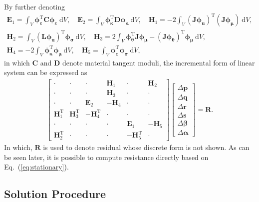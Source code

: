 \documentclass[3p,sort&compress,11pt,fleqn,review]{elsarticle}
\newcommand*{\eqsref}[1]{Eq.~(\ref{#1})}
\newcommand*{\mb}[1]{\boldsymbol{#1}}
\newcommand*{\mT}{\mathrm{T}}
\newcommand*{\md}[1]{\mathrm{d}#1}
\begin{document}
By further denoting
\begin{gather*}
\mb{E}_1=\int_V\mb{\phi}_{\mb{\varepsilon}}^\mT\mb{C}\mb{\phi}_{\mb{\varepsilon}}~\md{V},\quad
\mb{E}_2=\int_V\mb{\phi}_{\mb{\kappa}}^\mT\mb{D}\mb{\phi}_{\mb{\kappa}}~\md{V},\quad
\mb{H}_1=-2\int_V\left(\mb{J}\mb{\phi}_{\mb{u}}\right)^\mT\left(\mb{J}\mb{\phi}_{\mb{\mu}}\right)~\md{V},\\
\mb{H}_2=\int_V\left(\mb{L}\mb{\phi}_{\mb{u}}\right)^\mT\mb{\phi}_{\mb{\sigma}}~\md{V},\quad
\mb{H}_3=2\int_V\mb{\phi}_{\mb{\theta}}^\mT\mb{J}\mb{\phi}_{\mb{\mu}}-\left(\mb{J}\mb{\phi}_{\mb{\theta}}\right)^\mT\mb{\phi}_{\mb{\mu}}~\md{V},\\
\mb{H}_4=-2\int_V\mb{\phi}_{\mb{\kappa}}^\mT\mb{\phi}_{\mb{\mu}}~\md{V},\quad
\mb{H}_5=\int_V\mb{\phi}_{\mb{\varepsilon}}^\mT\mb{\phi}_{\mb{\sigma}}~\md{V},\quad
\end{gather*}
in which $\mb{C}$ and $\mb{D}$ denote material tangent moduli, the incremental form of linear system can be expressed as
\begin{gather}\label{eq:incremental_form}
\begin{bmatrix}
\cdot&\cdot&\cdot&\mb{H}_1&\cdot&\mb{H}_2\\
\cdot&\cdot&\cdot&\mb{H}_3&\cdot&\cdot\\
\cdot&\cdot&\mb{E}_2&-\mb{H}_4&\cdot&\cdot\\
\mb{H}_1^\mT&\mb{H}_3^\mT&-\mb{H}_4^\mT&\cdot&\cdot&\cdot\\
\cdot&\cdot&\cdot&\cdot&\mb{E}_1&-\mb{H}_5\\
\mb{H}_2^\mT&\cdot&\cdot&\cdot&-\mb{H}_5^\mT&\cdot
\end{bmatrix}
\begin{bmatrix}
\Delta\mb{p}\\\Delta\mb{q}\\\Delta\mb{r}\\\Delta\mb{s}\\\Delta\mb{\beta}\\\Delta\mb{\alpha}
\end{bmatrix}=\mb{R}.
\end{gather}
In which, $\mb{R}$ is used to denote residual whose discrete form is not shown. As can be seen later, it is possible to compute resistance directly based on \eqsref{eq:stationary}.
\subsection{Solution Procedure}
\end{document}
